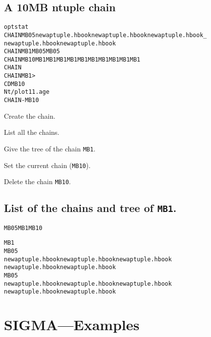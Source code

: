 \subsection*{A 10MB ntuple chain}
\begin{alltt}
      opt stat
     CHAIN MB05   newaptuple.hbook newaptuple.hbook newaptuple.hbook  _
                   newaptuple.hbook newaptuple.hbook
     CHAIN MB1    MB05 MB05
     CHAIN MB10   MB1 MB1 MB1 MB1 MB1 MB1 MB1 MB1 MB1 MB1
     CHAIN
     CHAIN MB1>
     CD MB10
      Nt/plot 11.age
     CHAIN -MB10
\end{alltt} 
\begin{DinglistE}
\item Create the chain.
\item List all the chains.
\item Give the tree of the chain {\tt MB1}.
\item Set the current chain ({\tt MB10}).
\item Delete the chain {\tt MB10}.
\end{DinglistE}
\subsection*{List of the chains and tree of {\tt MB1}.}
\begin{alltt}

  MB05      MB1       MB10

  MB1
     MB05
        newaptuple.hbook   newaptuple.hbook   newaptuple.hbook
        newaptuple.hbook   newaptuple.hbook
     MB05
        newaptuple.hbook   newaptuple.hbook   newaptuple.hbook
        newaptuple.hbook   newaptuple.hbook
\end{alltt}
\clearpage

\section{SIGMA---Examples}
